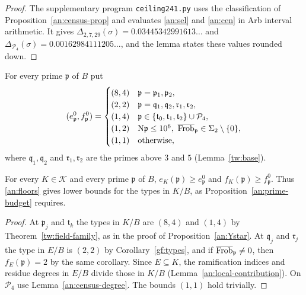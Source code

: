 \begin{proof}
The supplementary program \texttt{ceiling241.py} uses the classification of
Proposition~\ref{an:census-prop} and evaluates \eqref{an:sel} and
\eqref{an:cen} in Arb interval arithmetic. It gives
$\Delta_{2,7,29}(\sigma)=0.03445342991613\ldots$ and
$\Delta_{\mathcal P_4}(\sigma)=0.00162984111205\ldots$, and the lemma states
these values rounded down.
\end{proof}

For every prime $\mathfrak p$ of $B$ put
\begin{equation}\label{an:floors}
 (e^0_{\mathfrak p},f^0_{\mathfrak p})=
 \begin{cases}
 (8,4)&\mathfrak p=\mathfrak p_1,\mathfrak p_2,\\
 (2,2)&\mathfrak p=\mathfrak q_1,\mathfrak q_2,\mathfrak r_1,\mathfrak r_2,\\
 (1,4)&\mathfrak p\in\{\mathfrak t_0,\mathfrak t_1,\mathfrak t_2\}\cup\mathcal P_4,\\
 (1,2)&\mathrm N\mathfrak p\le10^6,\ \overline{\operatorname{Frob}}_{\mathfrak p}\in\Sigma_2\setminus\{0\},\\
 (1,1)&\text{otherwise},
 \end{cases}
\end{equation}
where $\mathfrak q_1,\mathfrak q_2$ and $\mathfrak r_1,\mathfrak r_2$ are the
primes above $3$ and $5$ (Lemma~\ref{tw:base}).

\begin{lemma}\label{an:floors-valid}
For every $K\in\mathcal K$ and every prime $\mathfrak p$ of $B$,
$e_K(\mathfrak p)\ge e^0_{\mathfrak p}$ and
$f_K(\mathfrak p)\ge f^0_{\mathfrak p}$. Thus \eqref{an:floors} gives lower
bounds for the types in $K/B$, as Proposition~\ref{an:prime-budget}
requires.
\end{lemma}

\begin{proof}
At $\mathfrak p_j$ and $\mathfrak t_k$ the types in $K/B$ are $(8,4)$ and
$(1,4)$ by Theorem~\ref{tw:field-family}, as in the proof of
Proposition~\ref{an:Ystar}. At $\mathfrak q_j$ and $\mathfrak r_j$ the type
in $E/B$ is $(2,2)$ by Corollary~\ref{gf:types}, and if
$\overline{\operatorname{Frob}}_{\mathfrak p}\ne0$, then $f_E(\mathfrak p)=2$ by the same corollary.
Since $E\subseteq K$, the ramification indices and residue degrees in $E/B$
divide those in $K/B$ (Lemma~\ref{an:local-contribution}). On
$\mathcal P_4$ use Lemma~\ref{an:census-degree}. The bounds $(1,1)$ hold
trivially.
\end{proof}

